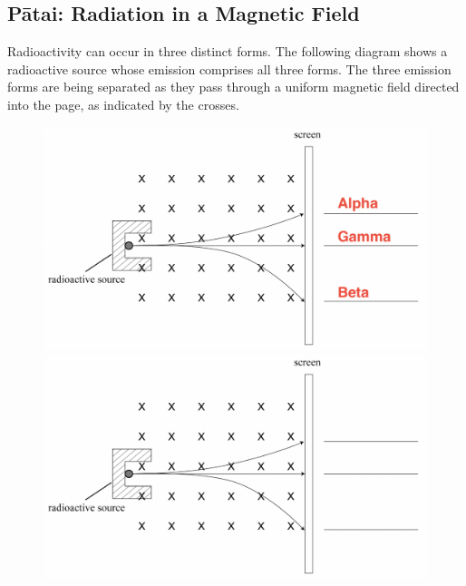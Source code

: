 \documentclass[12pt]{report}
\begin{document}
\subsection{Pātai: Radiation in a Magnetic Field}
Radioactivity can occur in three distinct forms. The following diagram shows a radioactive source whose emission comprises all three forms. The three emission forms are being separated as they pass through a uniform magnetic field directed into the page, as indicated by the crosses.

\begin{figure}[ht]
	\centering
		{\includegraphics[width=0.8\linewidth]{radiation-magnetic-field-2-answer.png}}
		{\includegraphics[width=0.8\linewidth]{radiation-magnetic-field-2.png}}
\end{figure}
\end{document}
